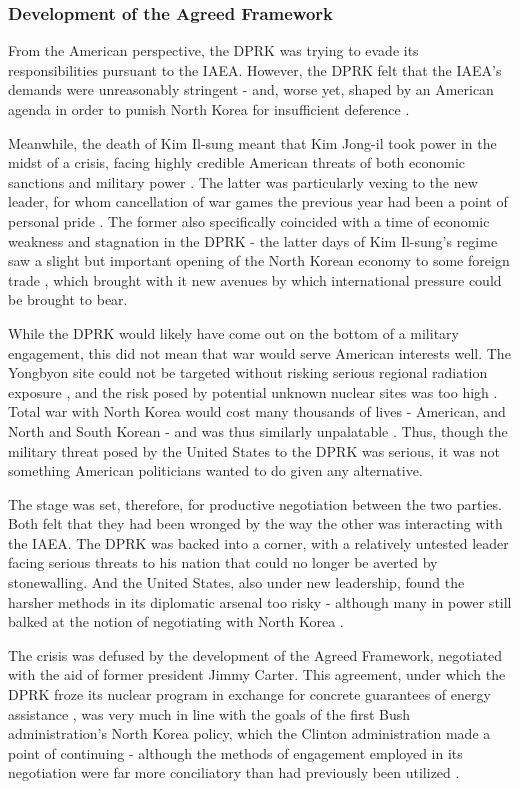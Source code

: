 \documentclass{article}
\begin{document}
\subsubsection{Development of the Agreed Framework}

From the American perspective, the DPRK was trying to evade its responsibilities pursuant to the IAEA. However, the DPRK felt that the IAEA's demands were unreasonably stringent - and, worse yet, shaped by an American agenda in order to punish North Korea for insufficient deference \cite{cumings}.

Meanwhile, the death of Kim Il-sung meant that Kim Jong-il took power in the midst of a crisis, facing highly credible American threats of both economic sanctions and military power \cite{cerami}. The latter was particularly vexing to the new leader, for whom cancellation of war games the previous year had been a point of personal pride \cite{farrell}. The former also specifically coincided with a time of economic weakness and stagnation in the DPRK - the latter days of Kim Il-sung's regime saw a slight but important opening of the North Korean economy to some foreign trade \cite{sigal}, which brought with it new avenues by which international pressure could be brought to bear.

While the DPRK would likely have come out on the bottom of a military engagement, this did not mean that war would serve American interests well. The Yongbyon site could not be targeted without risking serious regional radiation exposure \cite{beal}, and the risk posed by potential unknown nuclear sites was too high \cite{sigal}. Total war with North Korea would cost many thousands of lives - American, and North and South Korean - and was thus similarly unpalatable \cite{cumings}. Thus, though the military threat posed by the United States to the DPRK was serious, it was not something American politicians wanted to do given any alternative.
	
The stage was set, therefore, for productive negotiation between the two parties. Both felt that they had been wronged by the way the other was interacting with the IAEA. The DPRK was backed into a corner, with a relatively untested leader facing serious threats to his nation that could no longer be averted by stonewalling. And the United States, also under new leadership, found the harsher methods in its diplomatic arsenal too risky - although many in power still balked at the notion of negotiating with North Korea \cite{hecker2}.

The crisis was defused by the development of the Agreed Framework, negotiated with the aid of former president Jimmy Carter. This agreement, under which the DPRK froze its nuclear program in exchange for concrete guarantees of energy assistance \cite{agreed}, was very much in line with the goals of the first Bush administration's North Korea policy, which the Clinton administration made a point of continuing \cite{cerami} - although the methods of engagement employed in its negotiation were far more conciliatory than had previously been utilized \cite{sigal}.
\end{document}
